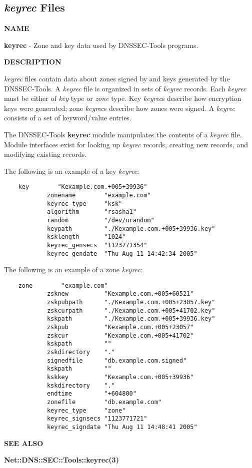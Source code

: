 \clearpage

\subsection{{\it keyrec} Files}

{\bf NAME}

{\bf keyrec} - Zone and key data used by DNSSEC-Tools programs.

{\bf DESCRIPTION}

{\it keyrec} files contain data about zones signed by and keys generated by
the DNSSEC-Tools.  A {\it keyrec} file is organized in sets of {\it keyrec}
records.  Each {\it keyrec} must be either of {\it key} type or {\it zone}
type.  Key {\it keyrec}s describe how encryption keys were generated; zone
{\it keyrec}s describe how zones were signed.  A {\it keyrec} consists of a
set of keyword/value entries.

The DNSSEC-Tools {\bf keyrec} module manipulates the contents of a {\it
keyrec} file.  Module interfaces exist for looking up {\it keyrec} records,
creating new records, and modifying existing records.

The following is an example of a key {\it keyrec}:

\begin{verbatim}
    key        "Kexample.com.+005+39936"
            zonename        "example.com"
            keyrec_type     "ksk"
            algorithm       "rsasha1"
            random          "/dev/urandom"
            keypath         "./Kexample.com.+005+39936.key"
            ksklength       "1024"
            keyrec_gensecs  "1123771354"
            keyrec_gendate  "Thu Aug 11 14:42:34 2005"
\end{verbatim}

The following is an example of a zone {\it keyrec}:

\begin{verbatim}
    zone        "example.com"
            zsknew          "Kexample.com.+005+60521"
            zskpubpath      "./Kexample.com.+005+23057.key"
            zskcurpath      "./Kexample.com.+005+41702.key"
            kskpath         "./Kexample.com.+005+39936.key"
            zskpub          "Kexample.com.+005+23057"
            zskcur          "Kexample.com.+005+41702"
            kskpath         ""
            zskdirectory    "."
            signedfile      "db.example.com.signed"
            kskpath         ""
            kskkey          "Kexample.com.+005+39936"
            kskdirectory    "."
            endtime         "+604800"
            zonefile        "db.example.com"
            keyrec_type     "zone"
            keyrec_signsecs "1123771721"
            keyrec_signdate "Thu Aug 11 14:48:41 2005"
\end{verbatim}

{\bf SEE ALSO}

{\bf Net::DNS::SEC::Tools::keyrec(3)}

